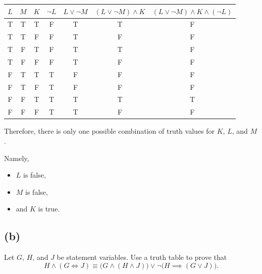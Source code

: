 \begin{solution}
\begin{center}
\begin{tabular}{c|c|c|c|c|c|c}
$L$ & $M$ & $K$ & $\neg L$
& $L \vee \neg M$
& $(L \vee \neg M) \wedge K$
& $(L \vee \neg M) \wedge K \wedge (\neg L)$ \\
\hline
T & T & T & F & T & T & F\\
T & T & F & F & T & F & F \\
T & F & T & F & T & T & F \\
T & F & F & F & T & F & F \\
F & T & T & T & F & F & F \\
F & T & F & T & F & F & F \\
F & F & T & T & T & T & T \\
F & F & F & T & T & F & F
\end{tabular}
\end{center}

Therefore, there is only one possible combination of truth values for $K$, $L$, and $M$.

Namely,
\begin{itemize}
    \item $L$ is false,
    \item $M$ is false,
    \item and $K$ is true.
\end{itemize}

\end{solution}
\newpage
\subsection{(b)}
\begin{problem}
    Let $G$, $H$, and $J$ be statement variables. Use a truth table to
    prove that
    \[
        H \land (G \iff J)
        \equiv
        \bigl(G \land (H \land J)\bigr)
        \lor
        \neg\bigl(H \implies (G \lor J)\bigr).
    \]
\end{problem}

